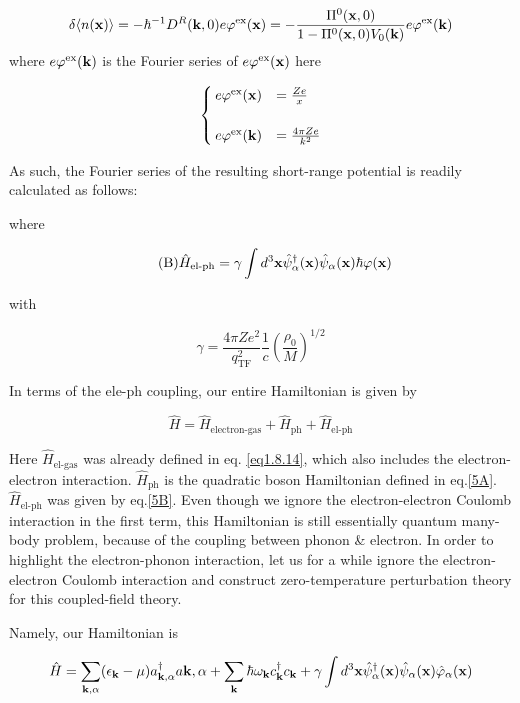 \[\delta\langle n({\bf x})\rangle =-\hbar^{-1}D^R({\bf k},0)e\varphi^{\text{ex}}({\bf x}) = -\frac{\Pi^0({\bf x},0)}{1- \Pi^0({\bf x},0)V_0({\bf k})}e\varphi^{\text{ex}}({\bf k})\]
where $e\varphi^{\text{ex}}({\bf k})$ is the Fourier series of $e\varphi^{\text{ex}}({\bf x})$ here

\[\begin{cases}
e\varphi^{\text{ex}}({\bf x}) &= \frac{Ze}{x}\\
&\\
e\varphi^{\text{ex}}({\bf k}) &= \frac{4\pi Ze}{k^2}
\end{cases}\]

As such, the Fourier series of the resulting short-range potential is readily calculated as follows:

where

\begin{align}\tag{B}\label{5B}
\hat{H}_{\text{el-ph}} = \gamma\int d^3{\bf x}\hat{\psi}_{\alpha}^\dagger({\bf x})\hat{\psi}_{\alpha}({\bf x})\hbar\varphi({\bf x})
\end{align}

with

\[\gamma = \frac{4\pi Ze^2}{q_{\text{TF}}^2}\frac{1}{c}\left(\frac{\rho_0}{M}\right)^{1/2} \]

In terms of the ele-ph coupling, our entire Hamiltonian is given by

\[\hat{H}=\hat{H}_{\text{electron-gas}}+\hat{H}_{\text{ph}}+\hat{H}_{\text{el-ph}} \]

Here $\hat{H}_{\text{el-gas}}$ was already defined in eq. \eqref{eq1.8.14}, which also includes the electron-electron interaction. $\hat{H}_{\text{ph}}$ is the quadratic boson Hamiltonian defined in eq.\eqref{5A}. $\hat{H}_{\text{el-ph}}$ was given by eq.\eqref{5B}. Even though we ignore the electron-electron Coulomb interaction in the first term, this Hamiltonian is still essentially quantum many-body problem, because of the coupling between phonon \& electron. In order to highlight the electron-phonon interaction, let us for a while ignore the electron-electron Coulomb interaction and construct zero-temperature perturbation theory for this coupled-field theory. 

Namely, our Hamiltonian is

\[\hat{H} = \sum_{\bf k,\alpha}(\epsilon_{\bf k}-\mu)a^\dagger_{\bf k,\alpha}a{\bf k,\alpha} + \sum_{\bf k}\hbar\omega_{\bf k}c_{\bf k}^\dagger c_{\bf k} + \gamma\int d^3{\bf x}\hat\psi_\alpha^\dagger({\bf x})\hat\psi_\alpha({\bf x})\hat\varphi_\alpha({\bf x}) \]

